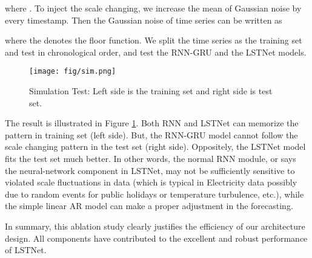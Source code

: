 \documentclass[sigconf]{acmart}
\def\electricity{{\sf Electricity}\xspace}
\begin{document}
where . To inject the scale changing, we increase the mean of Gaussian noise by  every  timestamp. Then the Gaussian noise of time series  can be written as 

where the  denotes the floor function. We split the time series as the training set and test in chronological order, and test the RNN-GRU and the LSTNet models. 
\begin{figure}
  \centering
  \texttt{[image: fig/sim.png]}
  \label{fig:tra-var}
\caption{Simulation Test: Left side is the training set and right side is test set.}
\label{fig:sim}
\end{figure}
The result is illustrated in Figure \ref{fig:sim}. Both RNN and LSTNet can memorize the pattern in training set (left side). But, the RNN-GRU model cannot follow the scale changing pattern in the test set (right side). Oppositely, the LSTNet model fits the test set much better. In other words, the normal RNN module, or says the neural-network component in LSTNet, may not be sufficiently sensitive to violated scale fluctuations in data (which is typical in \electricity data possibly due to random events for public holidays or temperature turbulence, etc.), while the simple linear AR model can make a proper adjustment in the forecasting. 

In summary, this ablation study clearly justifies the efficiency of our architecture design. All components have contributed to the excellent and robust performance of LSTNet.
\end{document}
